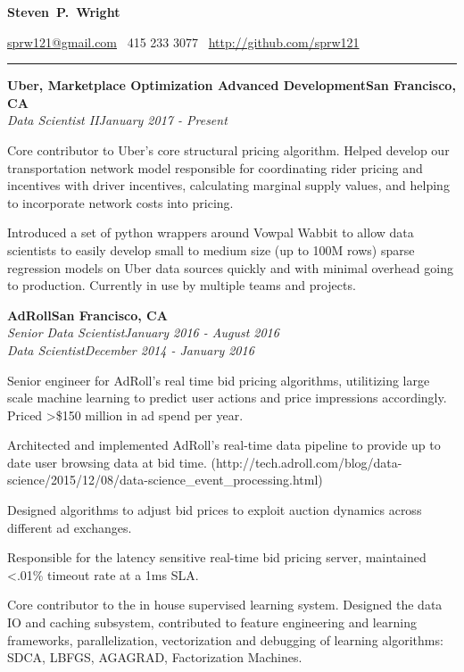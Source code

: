 \documentclass{article}
\newcommand{\ressection}[1]{\noindent{\large\textbf{#1}}\vspace{2pt}\hrule\vspace{4pt}}
\newcommand{\leftandright}[2]{\noindent\textbf{#1}\hfill\textbf{#2}}
\newcommand{\leftandrighti}[2]{\indent\textit{#1}\hfill\textit{#2}}
\begin{document}
\sffamily

\begin{center}
\textbf{\huge{Steven~P.~Wright}}

\href{mailto:sprw121@gmail.com}{sprw121@gmail.com}
\textbullet\, 415 233 3077
\textbullet\, \href{https://github.com/sprw121}{http://github.com/sprw121}
\end{center}

\ressection{Work experience}

\leftandright{Uber, Marketplace Optimization Advanced Development}{San Francisco, CA} \\
\leftandrighti{Data Scientist II}
	      {January 2017 - Present}
\begin{itemize*}
\item Core contributor to Uber's core structural pricing algorithm. Helped develop our transportation network model responsible for coordinating rider pricing and incentives with driver incentives, calculating marginal supply values, and helping to incorporate network costs into pricing.
\item Introduced a set of python wrappers around Vowpal Wabbit to allow data scientists to easily develop small to medium size (up to 100M rows) sparse regression models on Uber data sources quickly and with minimal overhead going to production. Currently in use by multiple teams and projects.
\end{itemize*}

\leftandright{AdRoll}{San Francisco, CA} \\
\leftandrighti{Senior Data Scientist}
	      {January 2016 - August 2016}\\
\leftandrighti{Data Scientist}
	      {December 2014 - January 2016}

\begin{itemize*}
\item Senior engineer for AdRoll's real time bid pricing algorithms, utilitizing
  large scale machine learning to predict user actions and price impressions accordingly.
  Priced \textgreater \$150 million in ad spend per year.
\item Architected and implemented AdRoll's real-time data pipeline to provide up to date
  user browsing data at bid time. (http://tech.adroll.com/blog/data-science/2015/12/08/data-science\_event\_processing.html)
\item Designed algorithms to adjust bid prices to exploit auction dynamics across
  different ad exchanges.
\item Responsible for the latency sensitive real-time bid pricing server,
  maintained \textless .01\% timeout rate at a 1ms SLA.
\item Core contributor to the in house supervised learning system. Designed the
  data IO and caching subsystem, contributed to feature engineering and learning frameworks,
  parallelization, vectorization and debugging of learning algorithms: SDCA, LBFGS, AGAGRAD,
  Factorization Machines.
\end{itemize*}
\end{document}
